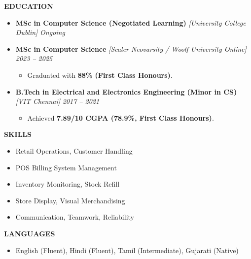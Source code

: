 \documentclass[a4paper,10pt]{article}
\newcommand{\resheading}[1]{{\small \colorbox{mygrey}{\begin{minipage}{0.975\textwidth}{\textbf{#1 \vphantom{p\^{E}}}}\end{minipage}}}}
\begin{document}
\resheading{\textbf{EDUCATION}}

\begin{itemize}\itemsep -0.4em

\item {\bf MSc in Computer Science (Negotiated Learning)} \textit{[University College Dublin]} 
\textit{\hfill Ongoing}

\item {\bf MSc in Computer Science} \textit{[Scaler Neovarsity / Woolf University Online]} 
\textit{\hfill 2023 – 2025}  
\begin{itemize}\itemsep -0.3em
    \item Graduated with \textbf{88\% (First Class Honours)}.
\end{itemize}

\item {\bf B.Tech in Electrical and Electronics Engineering (Minor in CS)} \textit{[VIT Chennai]} 
\textit{\hfill 2017 – 2021}  
\begin{itemize}\itemsep -0.3em
    \item Achieved \textbf{7.89/10 CGPA (78.9\%, First Class Honours)}.
\end{itemize}

\end{itemize}

\resheading{\textbf{SKILLS} }

\begin{itemize}\itemsep -0.4em
    \item Retail Operations, Customer Handling  
    \item POS Billing System Management  
    \item Inventory Monitoring, Stock Refill  
    \item Store Display, Visual Merchandising  
    \item Communication, Teamwork, Reliability  
\end{itemize}

\resheading{\textbf{LANGUAGES} }
\begin{itemize}\itemsep -0.4em
    \item English (Fluent), Hindi (Fluent), Tamil (Intermediate), Gujarati (Native)
\end{itemize}
\end{document}

